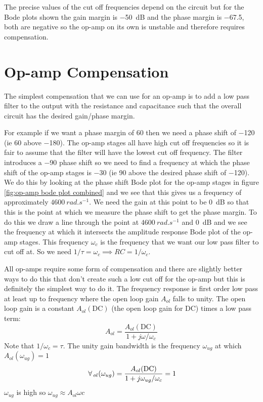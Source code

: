 \documentclass{article}
\begin{document}
    The precise values of the cut off frequencies depend on the circuit but for the Bode plots shown the gain margin is \SI{-50}{dB} and the phase margin is \SI{-67.5}{\SIUnitSymbolDegree}, both are negative so the op-amp on its own is unstable and therefore requires compensation.
    
    \section{Op-amp Compensation}
    The simplest compensation that we can use for an op-amp is to add a low pass filter to the output with the resistance and capacitance such that the overall circuit has the desired gain/phase margin.
    
    For example if we want a phase margin of \SI{60}{\SIUnitSymbolDegree} then we need a phase shift of \SI{-120}{\SIUnitSymbolDegree} (ie \SI{60}{\SIUnitSymbolDegree} above \SI{-180}{\SIUnitSymbolDegree}).
    The op-amp stages all have high cut off frequencies so it is fair to assume that the filter will have the lowest cut off frequency.
    The filter introduces a \SI{-90}{\SIUnitSymbolDegree} phase shift so we need to find a frequency at which the phase shift of the op-amp stages is \SI{-30}{\SIUnitSymbolDegree} (ie \SI{90}{\SIUnitSymbolDegree} above the desired phase shift of \SI{-120}{\SIUnitSymbolDegree}).
    We do this by looking at the phase shift Bode plot for the op-amp stages in figure \ref{fig:op-amp bode plot combined} and we see that this gives us a frequency of approximately \(\SI{4600}{rad.s^{-1}}\).
    We need the gain at this point to be \SI{0}{dB} so that this is the point at which we measure the phase shift to get the phase margin.
    To do this we draw a line through the point at \(\SI{4600}{rad.s^{-1}}\) and \SI{0}{dB} and we see the frequency at which it intersects the amplitude response Bode plot of the op-amp stages.
    This frequency \(\omega_c\) is the frequency that we want our low pass filter to cut off at.
    So we need \(1/\tau = \omega_c\implies RC = 1/\omega_c\).
    
    All op-amps require some form of compensation and there are slightly better ways to do this that don't create such a low cut off for the op-amp but this is definitely the simplest way to do it.
    The frequency response is first order low pass at least up to frequency where the open loop gain \(A_{ol}\) falls to unity.
    The open loop gain is a constant \(A_{ol}(\text{DC})\) (the open loop gain for DC) times a low pass term:
    \[A_{ol} = \frac{A_{ol}(\text{DC})}{1 + j\omega/\omega_c}\]
    Note that \(1/\omega_c = \tau\).
    The unity gain bandwidth is the frequency \(\omega_{ug}\) at which \(A_{ol}(\omega_{ug}) = 1\)
    \[\,\forall\,_{ol}(\omega_{ug}) = \frac{A_{ol}(\text{DC})}{1 + j\omega_{ug}/\omega_c} = 1\]
    \(\omega_{ug}\) is high so \(\omega_{ug} \approx A_{ol}\omega{c}\)
    
\end{document}
